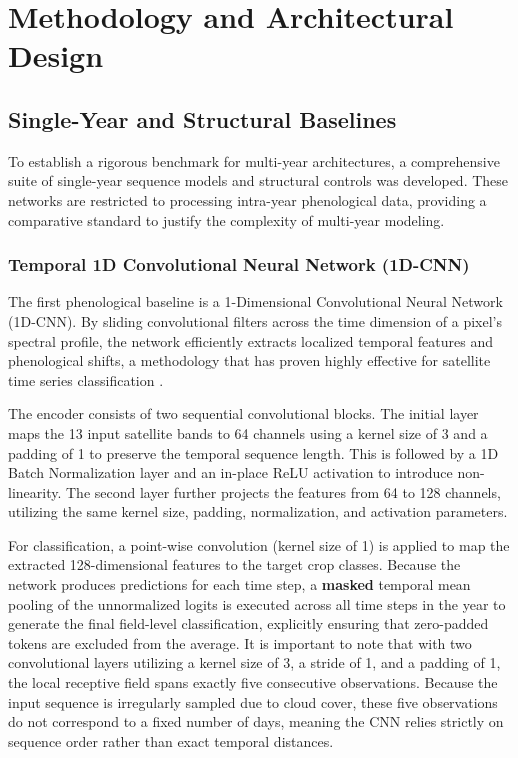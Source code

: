 \chapter{Methodology and Architectural Design}
\label{cha:methodology_sys_design}


\section{Single-Year and Structural Baselines}
\label{sec:single_year_baselines}

To establish a rigorous benchmark for multi-year architectures, a comprehensive suite of single-year sequence models and structural controls was developed.
These networks are restricted to processing intra-year phenological data, providing a comparative standard to justify the complexity of multi-year modeling.

\subsection{Temporal 1D Convolutional Neural Network (1D-CNN)}
\label{subsec:cnn_baseline}

The first phenological baseline is a 1-Dimensional Convolutional Neural Network (1D-CNN).
By sliding convolutional filters across the time dimension of a pixel's spectral profile, the network efficiently extracts localized
temporal features and phenological shifts, a methodology that has proven highly effective for satellite time series classification \cite{pelletier_temporal_2019}.

The encoder consists of two sequential convolutional blocks.
The initial layer maps the 13 input satellite bands to 64 channels using a kernel size of 3 and a padding of 1 to preserve the temporal sequence length.
This is followed by a 1D Batch Normalization layer and an in-place ReLU activation to introduce non-linearity.
The second layer further projects the features from 64 to 128 channels, utilizing the same kernel size, padding, normalization, and activation parameters.

For classification, a point-wise convolution (kernel size of 1) is applied to map the extracted 128-dimensional features to the target crop classes.
Because the network produces predictions for each time step, a \textbf{masked} temporal mean pooling of
the unnormalized logits is executed across all time steps in the year to generate the final field-level classification,
explicitly ensuring that zero-padded tokens are excluded from the average.
It is important to note that with two convolutional layers utilizing a kernel size of 3, a stride of 1, and a padding of 1,
the local receptive field spans exactly five consecutive observations.
Because the input sequence is irregularly sampled due to cloud cover, these five observations do not correspond
to a fixed number of days, meaning the CNN relies strictly on sequence order rather than exact temporal distances.

